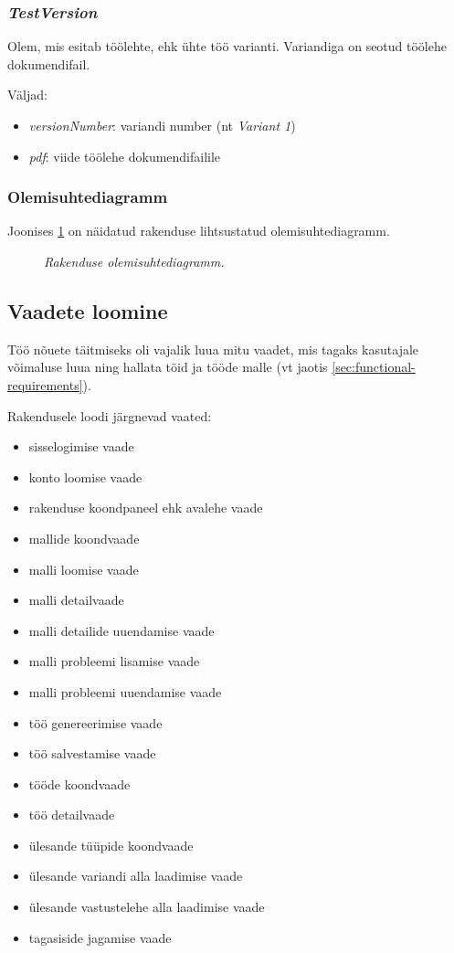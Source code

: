 \subsubsection{\emph{TestVersion}}

Olem, mis esitab töölehte, ehk ühte töö varianti. Variandiga on seotud töölehe dokumendifail.

Väljad:

\begin{itemize}
  \item \emph{versionNumber}: variandi number (nt \emph{Variant 1})
  \item \emph{pdf}: viide töölehe dokumendifailile
\end{itemize}

\subsubsection{Olemisuhtediagramm}

Joonises \ref{fig:uml} on näidatud rakenduse lihtsustatud olemisuhtediagramm.

\begin{figure}
\begin{adjustbox}{width=\textwidth}

\end{adjustbox}
\caption{\emph{Rakenduse olemisuhtediagramm.}}\label{fig:uml}
\end{figure}

\subsection{Vaadete loomine}

Töö nõuete täitmiseks oli vajalik luua mitu vaadet, mis tagaks kasutajale võimaluse luua ning hallata töid ja tööde malle (vt jaotis \ref{sec:functional-requirements}).

Rakendusele loodi järgnevad vaated:
\begin{itemize}
  \item sisselogimise vaade
  \item konto loomise vaade
  \item rakenduse koondpaneel ehk avalehe vaade
  \item mallide koondvaade
  \item malli loomise vaade
  \item malli detailvaade
  \item malli detailide uuendamise vaade
  \item malli probleemi lisamise vaade
  \item malli probleemi uuendamise vaade
  \item töö genereerimise vaade
  \item töö salvestamise vaade
  \item tööde koondvaade
  \item töö detailvaade
  \item ülesande tüüpide koondvaade
  \item ülesande variandi alla laadimise vaade
  \item ülesande vastustelehe alla laadimise vaade
  \item tagasiside jagamise vaade
\end{itemize}

